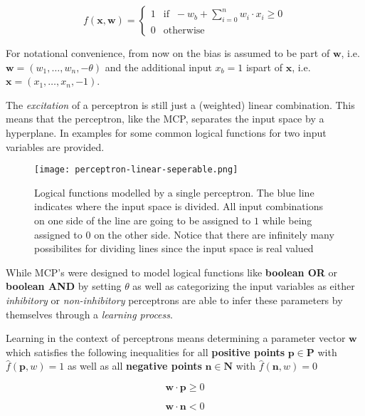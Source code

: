 \begin{equation}
    \label{eq:full-perceptron}
    f(\bm{x}, \bm{w}) = 
    \begin{cases}
        1 & \text{if } ~ -w_b + \sum_{i=0}^n w_i \cdot x_i \geq 0 \\
        0 & \text{otherwise}
    \end{cases}    
\end{equation}

For notational convenience, from now on the bias is assumed to be part of $\bm{w}$, i.e. $\bm{w} = (w_1, \dots, w_n, -\theta)$ and the additional input $x_b = 1$ ispart of $\bm{x}$, i.e. $\bm{x} = (x_1, \dots, x_n, -1)$.

The \textit{excitation} of a perceptron is still just a (weighted) linear combination.
This means that the perceptron, like the MCP, separates the input space by a hyperplane.
In  examples for some common logical functions for two input variables are provided.

\begin{figure}[htb!]
    \texttt{[image: perceptron-linear-seperable.png]}
    \caption{Logical functions modelled by a single perceptron. The blue line indicates where the input space is divided. All input combinations on one side of the line are going to be assigned to $1$ while being assigned to $0$ on the other side. Notice that there are infinitely many possibilites for dividing lines since the input space is real valued \cite{rudolph_lecture_2018}}
    \label{fig:perceptron-logic}
\end{figure}

While MCP's were designed to model logical functions like \textbf{boolean OR} or \textbf{boolean AND} by setting $\theta$ as well as categorizing the input variables as either \textit{inhibitory} or \textit{non-inhibitory} perceptrons are able to infer these parameters by themselves through a \textit{learning process}.

Learning in the context of perceptrons means determining a parameter vector $\bm{w}$ which satisfies the following inequalities for all \textbf{positive points} $\bm{p} \in \bm{P}$ with $\hat{f}(\bm{p}, w) = 1$ as well as all \textbf{negative points} $\bm{n} \in \bm{N}$ with $\hat{f}(\bm{n}, w) = 0$

\begin{equation}
    \bm{w} \cdot \bm{p} \geq 0
\end{equation}

\begin{equation}
    \bm{w} \cdot \bm{n} < 0
\end{equation}

